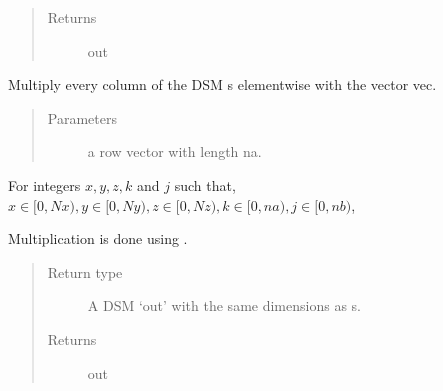 \documentclass[letterpaper,10pt,english]{sphinxmanual}
\begin{document}
\begin{fulllineitems}
\begin{fulllineitems}
\begin{quote}
\begin{description}
\item[{Returns}] \leavevmode
out

\end{description}\end{quote}

\end{fulllineitems}


\begin{fulllineitems}
\label{\detokenize{index:DictionarySparseMatrix.DS.double_dict_vec_multiply}}
Multiply every column of the DSM s elementwise with the     vector vec.
\begin{quote}\begin{description}
\item[{Parameters}] \leavevmode
{} \textendash{} a row vector with length na.

\end{description}\end{quote}

For integers \(x,y,z,k\) and \(j\) such that,
\(x \in [0,Nx), y \in [0,Ny), z \in [0,Nz), k \in [0,na),j \in [0,nb)\),

\begin{sphinxVerbatim}[commandchars=\\\{\}]
\PYG{p}{[}\PYG{p}{]}\PYG{p}{[}\PYG{p}{]}\PYG{p}{[}\PYG{p}{]}
\end{sphinxVerbatim}

Multiplication is done using     {\hyperref[\detokenize{index:DictionarySparseMatrix.DS}]{}}. 
\begin{quote}\begin{description}
\item[{Return type}] \leavevmode
A DSM ‘out’ with the same dimensions as s.

\item[{Returns}] \leavevmode
out


\end{description}
\end{quote}
\end{fulllineitems}
\end{fulllineitems}
\end{document}
